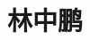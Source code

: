 \documentclass{moderncv}%
\title{林中鹏}
\begin{document}
\begin{CJK}{UTF8}{gbsn}                       %
\maketitle




% 


\nocite{*}

% 
% 


\clearpage
\end{CJK}
\end{document}
